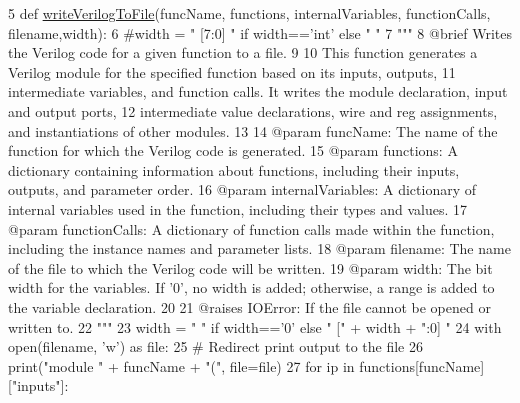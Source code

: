 \begin{DoxyCode}
5 \textcolor{keyword}{def }\hyperlink{namespaceutils_a6f07e72ab5f460900eea8da9ad34aeec}{writeVerilogToFile}(funcName, functions, internalVariables, functionCalls, 
      filename,width):
6     \textcolor{comment}{#width = " [7:0] " if width=='int' else " "
}
7     \textcolor{stringliteral}{"""
}
8 \textcolor{stringliteral}{    @brief Writes the Verilog code for a given function to a file.
}
9 \textcolor{stringliteral}{
}
10 \textcolor{stringliteral}{    This function generates a Verilog module for the specified function based on its inputs, outputs,
}
11 \textcolor{stringliteral}{    intermediate variables, and function calls. It writes the module declaration, input and output ports,
}
12 \textcolor{stringliteral}{    intermediate value declarations, wire and reg assignments, and instantiations of other modules.
}
13 \textcolor{stringliteral}{
}
14 \textcolor{stringliteral}{    @param funcName: The name of the function for which the Verilog code is generated.
}
15 \textcolor{stringliteral}{    @param functions: A dictionary containing information about functions, including their inputs, outputs,
       and parameter order.
}
16 \textcolor{stringliteral}{    @param internalVariables: A dictionary of internal variables used in the function, including their
       types and values.
}
17 \textcolor{stringliteral}{    @param functionCalls: A dictionary of function calls made within the function, including the instance
       names and parameter lists.
}
18 \textcolor{stringliteral}{    @param filename: The name of the file to which the Verilog code will be written.
}
19 \textcolor{stringliteral}{    @param width: The bit width for the variables. If '0', no width is added; otherwise, a range is added
       to the variable declaration.
}
20 \textcolor{stringliteral}{
}
21 \textcolor{stringliteral}{    @raises IOError: If the file cannot be opened or written to.
}
22 \textcolor{stringliteral}{    """}
23     width = \textcolor{stringliteral}{" "} \textcolor{keywordflow}{if} width==\textcolor{stringliteral}{'0'} \textcolor{keywordflow}{else} \textcolor{stringliteral}{" ["} + width + \textcolor{stringliteral}{":0] "}
24     with open(filename, \textcolor{stringliteral}{'w'}) \textcolor{keyword}{as} file:
25         \textcolor{comment}{# Redirect print output to the file
}
26         print(\textcolor{stringliteral}{"module "} + funcName + \textcolor{stringliteral}{"("}, file=file)
27         \textcolor{keywordflow}{for} ip \textcolor{keywordflow}{in} functions[funcName][\textcolor{stringliteral}{"inputs"}]:

\end{DoxyCode}
